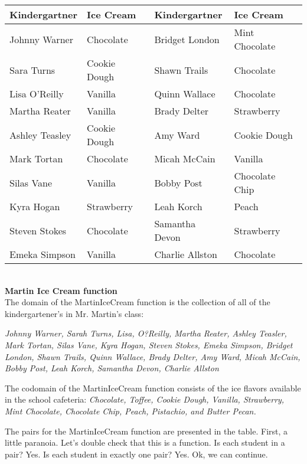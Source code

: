 \documentclass{ximera}
\begin{document}
\begin{center}

\begin{tabular}{|l|l|l|l|}
\hline
Kindergartner & Ice Cream & Kindergartner & Ice Cream \\\hline 
Johnny Warner & Chocolate & Bridget London & Mint Chocolate \\\hline 
Sara Turns & Cookie Dough & Shawn Trails & Chocolate \\\hline 
Lisa O'Reilly & Vanilla & Quinn Wallace & Chocolate \\\hline 
Martha Reater & Vanilla & Brady Delter & Strawberry \\\hline 
Ashley Teasley & Cookie Dough & Amy Ward & Cookie Dough \\\hline 
Mark Tortan & Chocolate & Micah McCain & Vanilla \\\hline 
Silas Vane & Vanilla & Bobby Post & Chocolate Chip \\\hline 
Kyra Hogan & Strawberry & Leah Korch & Peach \\\hline 
Steven Stokes & Chocolate & Samantha Devon & Strawberry \\\hline 
Emeka Simpson & Vanilla & Charlie Allston & Chocolate \\\hline 
\end{tabular}

\end{center}

\quad \\
\textbf{Martin Ice Cream function} \\

The domain of the MartinIceCream function is the collection of all of the kindergartener's in Mr. Martin's class: 

\textit{Johnny Warner, Sarah Turns, Lisa, O?Reilly, Martha Reater, Ashley Teasler, Mark Tortan, Silas Vane, Kyra Hogan, Steven Stokes, Emeka Simpson, Bridget London, Shawn Trails, Quinn Wallace, Brady Delter, Amy Ward, Micah McCain, Bobby Post, Leah Korch, Samantha Devon, Charlie Allston}


The codomain of the MartinIceCream function consists of the ice flavors available in the school cafeteria:
\textit{Chocolate, Toffee, Cookie Dough, Vanilla, Strawberry, Mint Chocolate, Chocolate Chip, Peach, Pistachio, and Butter Pecan.}

The pairs for the MartinIceCream function are presented in the table. First, a little paranoia. Let's double check that this is a function.
Is each student in a pair? Yes. Is each student in exactly one pair? Yes. Ok, we can continue.
\end{document}
